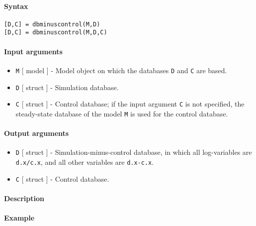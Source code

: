 


	\paragraph{Syntax}

\begin{verbatim}
[D,C] = dbminuscontrol(M,D)
[D,C] = dbminuscontrol(M,D,C)
\end{verbatim}

\paragraph{Input arguments}

\begin{itemize}
\item
  \texttt{M} {[} model {]} - Model object on which the databases
  \texttt{D} and \texttt{C} are based.
\item
  \texttt{D} {[} struct {]} - Simulation database.
\item
  \texttt{C} {[} struct {]} - Control database; if the input argument
  \texttt{C} is not specified, the steady-state database of the model
  \texttt{M} is used for the control database.
\end{itemize}

\paragraph{Output arguments}

\begin{itemize}
\item
  \texttt{D} {[} struct {]} - Simulation-minus-control database, in
  which all log-variables are \texttt{d.x/c.x}, and all other variables
  are \texttt{d.x-c.x}.
\item
  \texttt{C} {[} struct {]} - Control database.
\end{itemize}

\paragraph{Description}

\paragraph{Example}

